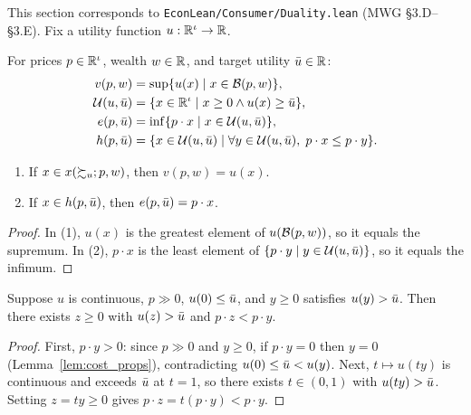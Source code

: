This section corresponds to \texttt{EconLean/Consumer/Duality.lean} (MWG \S3.D--\S3.E).
Fix a utility function $u : \mathbb{R}^\iota \to \mathbb{R}$.

\begin{definition}
\label{def:duality_objs}
\leanok
{}
For prices $p \in \mathbb{R}^\iota$, wealth $w \in \mathbb{R}$, and target utility $\bar{u} \in \mathbb{R}$:
\begin{align*}
  v(p, w) &= \sup \{u(x) \mid x \in \mathcal{B}(p, w)\}, \\
  \mathcal{U}(u, \bar{u}) &= \{x \in \mathbb{R}^\iota \mid x \ge 0 \land u(x) \ge \bar{u}\}, \\
  e(p, \bar{u}) &= \inf \{p \cdot x \mid x \in \mathcal{U}(u, \bar{u})\}, \\
  h(p, \bar{u}) &= \{x \in \mathcal{U}(u, \bar{u}) \mid \forall y \in \mathcal{U}(u, \bar{u}),\; p \cdot x \le p \cdot y\}.
\end{align*}
\end{definition}

\begin{lemma}
\label{lem:value_eq}
\leanok
{}
\begin{enumerate}
  \item If $x \in x(\succsim_u; p, w)$, then $v(p, w) = u(x)$.
  \item If $x \in h(p, \bar{u})$, then $e(p, \bar{u}) = p \cdot x$.
\end{enumerate}
\end{lemma}
\begin{proof}
\leanok
In (1), $u(x)$ is the greatest element of $u(\mathcal{B}(p, w))$, so it equals the supremum.
In (2), $p \cdot x$ is the least element of $\{p \cdot y \mid y \in \mathcal{U}(u, \bar{u})\}$,
so it equals the infimum.
\end{proof}

\begin{lemma}
\label{lem:exists_cheaper_above}
\leanok
{}
Suppose $u$ is continuous, $p \gg 0$, $u(0) \le \bar{u}$, and $y \ge 0$ satisfies
$u(y) > \bar{u}$. Then there exists $z \ge 0$ with $u(z) > \bar{u}$ and $p \cdot z < p \cdot y$.
\end{lemma}
\begin{proof}
\leanok
First, $p \cdot y > 0$: since $p \gg 0$ and $y \ge 0$, if $p \cdot y = 0$ then $y = 0$
(Lemma~\ref{lem:cost_props}), contradicting $u(0) \le \bar{u} < u(y)$. Next, $t \mapsto u(t y)$
is continuous and exceeds $\bar{u}$ at $t = 1$, so there exists $t \in (0, 1)$ with
$u(t y) > \bar{u}$. Setting $z = t y \ge 0$ gives $p \cdot z = t (p \cdot y) < p \cdot y$.
\end{proof}

